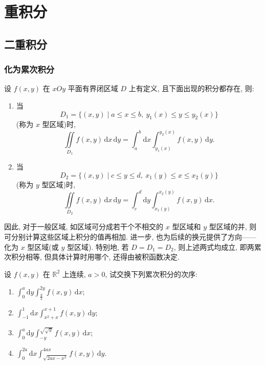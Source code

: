 \documentclass[../数学分析培优讲义.tex]{subfiles}
\begin{document}
\setcounter{chapter}{11}
\pagestyle{fancy}

\chapter{重积分}


\section{二重积分}


\subsection{化为累次积分}

设 $f(x,y)$ 在 $xOy$ 平面有界闭区域 $D$ 上有定义, 且下面出现的积分都存在, 则:

\begin{enumerate}[label=(\arabic*)]
    \item 当
    \[
        D_1=\{(x,y)\mid a\leq x\leq b,\ y_1(x)\leq y\leq y_2(x)\}
    \]
    (称为 $x$ 型区域)时,
    \[
        \iint\limits_{D_1}f(x,y)\,\mathrm{d}x\,\mathrm{d}y
        =\int_a^b\mathrm{d}x\int_{y_1(x)}^{y_2(x)}f(x,y)\,\mathrm{d}y.
    \]

    \item 当
    \[
        D_2=\{(x,y)\mid c\leq y\leq d,\ x_1(y)\leq x\leq x_2(y)\}
    \]
    (称为 $y$ 型区域)时,
    \[
        \iint\limits_{D_2}f(x,y)\,\mathrm{d}x\,\mathrm{d}y
        =\int_c^d\mathrm{d}y\int_{x_1(y)}^{x_2(y)}f(x,y)\,\mathrm{d}x.
    \]
\end{enumerate}

因此, 对于一般区域, 如区域可分成若干个不相交的 $x$ 型区域和 $y$ 型区域的并, 则可分别计算这些区域上积分的值再相加. 进一步, 也为后续的换元提供了方向——化为 $x$ 型区域(或 $y$ 型区域). 特别地, 若 $D=D_1=D_2$, 则上述两式均成立, 即两累次积分相等, 但具体计算时用哪个, 还得由被积函数决定.

\begin{example}
设 $f(x,y)$ 在 $\mathbb{R}^2$ 上连续, $a>0$, 试交换下列累次积分的次序:
\begin{enumerate}[label=(\arabic*)]
    \item $\displaystyle\int_0^a\mathrm{d}y\int_{\frac{y}{2}}^{2y}f(x,y)\,\mathrm{d}x$;
    \item $\displaystyle\int_{-1}^1\mathrm{d}x\int_{x^2+x}^{x+1}f(x,y)\,\mathrm{d}y$;
    \item $\displaystyle\int_0^a\mathrm{d}y\int_{-y}^{\sqrt{\sqrt{y}}}f(x,y)\,\mathrm{d}x$;
    \item $\displaystyle\int_0^{2a}\mathrm{d}x\int_{\sqrt{2ax-x^2}}^{4ax}f(x,y)\,\mathrm{d}y$.
\end{enumerate}
\end{example}
\exampleblank
\end{document}

